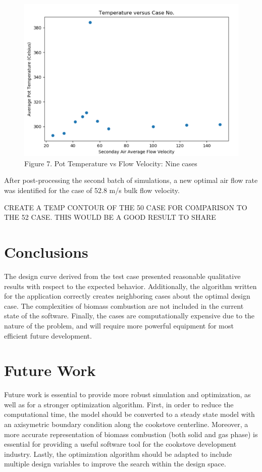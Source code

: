 \documentclass[3p,times,twocolumn]{elsarticle}
\begin{document}
\begin{figure}
	\includegraphics[width=\linewidth]{second.png}
	\caption{Figure 7. Pot Temperature vs Flow Velocity: Nine cases}
\end{figure}


After post-processing the second batch of simulations, a new optimal air flow rate was identified for the case of 52.8 m/s bulk flow velocity.

CREATE A TEMP CONTOUR OF THE 50 CASE FOR COMPARISON TO THE 52 CASE. THIS WOULD BE A GOOD RESULT TO SHARE


\section{Conclusions}
The design curve derived from the test case presented reasonable qualitative results with respect to the expected behavior. Additionally, the algorithm written for the application correctly creates neighboring cases about the optimal design case. The complexities of biomass combustion are not included in the current state of the software. Finally, the cases are computationally expensive due to the nature of the problem, and will require more powerful equipment for most efficient future development.


\section{Future Work}
Future work is essential to provide more robust simulation and optimization, as well as for a stronger optimization algorithm. First, in order to reduce the computational time, the model should be converted to a steady state model with an axisymetric boundary condition along the cookstove centerline. Moreover, a more accurate representation of biomass combustion (both solid and gas phase) is essential for providing a useful software tool for the cookstove development industry. Lastly, the optimization algorithm should be adapted to include multiple design variables to improve the search within the design space.
\end{document}
